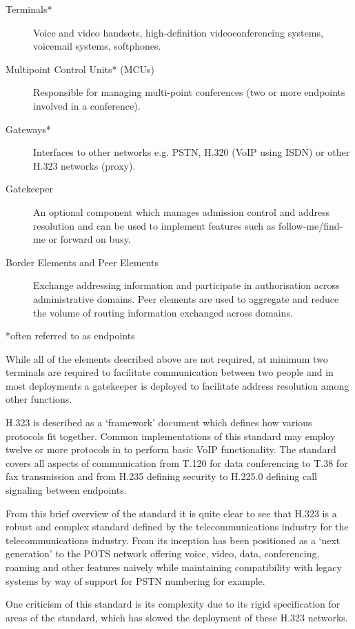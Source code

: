 \begin{description}
\item[Terminals*] Voice and video handsets, high-definition videoconferencing systems, voicemail systems, softphones.
\item[Multipoint Control Units* (MCUs)] Responsible for managing multi-point conferences (two or more endpoints involved in  a conference).
\item[Gateways*] Interfaces to other networks e.g. PSTN, H.320 (VoIP using ISDN) or other H.323 networks (proxy).
\item[Gatekeeper] An optional component which manages admission control and address resolution and can be used to implement features such as follow-me/find-me or forward on busy.
\item[Border Elements and Peer Elements] Exchange addressing information and participate in authorisation across administrative domains. Peer elements are used to aggregate and reduce the volume of routing information exchanged across domains.
\end{description} 
*often referred to as endpoints

While all of the elements described above are not required, at minimum two terminals are required to facilitate communication between two people and in most deployments a gatekeeper is deployed to facilitate address resolution among other functions.

H.323 is described as a ‘framework’ document which defines how various protocols fit together. Common implementations of this standard may employ twelve or more protocols in to perform basic VoIP functionality. The standard covers all aspects of communication from T.120 for data conferencing to T.38 for fax transmission and from H.235 defining security to H.225.0 defining call signaling between endpoints.

From this brief overview of the standard it is quite clear to see that H.323 is a robust and complex standard defined by the telecommunications industry for the telecommunications industry. From its inception has been positioned as a ‘next generation’ to the POTS network offering voice, video, data, conferencing, roaming and other features naively while maintaining compatibility with legacy systems by way of support for PSTN numbering for example.

One criticism of this standard is its complexity due to its rigid specification for areas of the standard, which has slowed the deployment of these H.323 networks.

